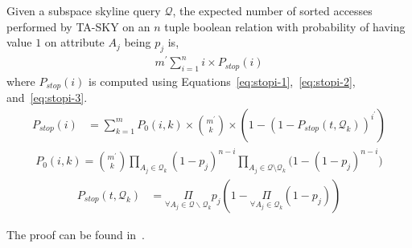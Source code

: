 



\begin{theorem}\label{thm:expectedCostTA-SKY}
Given a subspace skyline query $\mathcal{Q}$, the expected number of sorted accesses performed by TA-SKY on an $n$ tuple boolean relation with probability of having value $1$ on attribute $A_j$ being $p_j$ is,
\begin{align}
m^\prime \sum_{i=1}^n i\times P_{stop}(i)
\end{align}
where $P_{stop}(i)$ is computed using Equations~\ref{eq:stopi-1},~\ref{eq:stopi-2}, and~\ref{eq:stopi-3}.
\begin{align}\label{eq:stopi-1}
P_{stop}(i) &= \sum_{k=1}^m P_0(i, k) \times {m^\prime \choose k} \times (1 - (1 - P_{stop}(t, \mathcal{Q}_k))^{i^\prime})
\end{align}
\begin{align}\label{eq:stopi-2}
P_0(i, k) = {m^\prime \choose k} \prod_{A_j \in \mathcal{Q}_k} (1 - p_j)^{n-i} \prod_{A_j \in \mathcal{Q} \setminus \mathcal{Q}_k} \big(1 - (1 - p_j)^{n-i}\big)
\end{align}
\begin{align}\label{eq:stopi-3}
P_{stop}(t, \mathcal{Q}_k) &= \underset{\forall A_j \in \mathcal{Q}\backslash \mathcal{Q}_k} {\Pi} p_j (1-\underset{\forall A_j \in \mathcal{Q}_k} {\Pi} (1 - p_j))
\end{align}
\end{theorem}

The proof can be found in~\cite{TechReport}.
